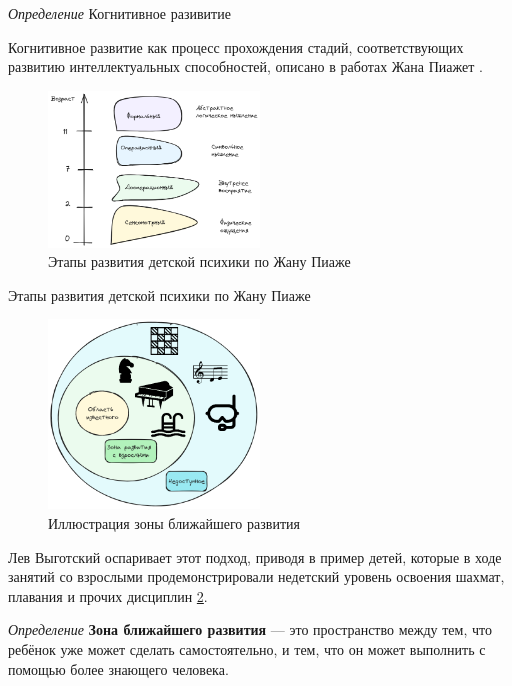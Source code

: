 
\textit{Определение} Когнитивное разивитие

Когнитивное развитие как процесс прохождения стадий, соответствующих развитию интеллектуальных
способностей, описано в работах Жана Пиажет \cite{piaget1952origins}.


\begin{figure}[h]
    \centering
    \includegraphics[width=0.5\textwidth]{assets/pedagogic/psy/piage.excalidraw.png}
    \caption{Этапы развития детской психики по Жану Пиаже \cite{piaget1952origins}}
    \label{piage}
\end{figure}

Этапы развития детской психики по Жану Пиаже


\begin{figure}[h]
    \centering
    \includegraphics[width=0.5\textwidth]{assets/pedagogic/psy/proximal_growth.excalidraw.png}
    \caption{Иллюстрация зоны ближайшего развития}
    \label{proximal_growth}
\end{figure}



Лев Выготский оспаривает этот подход, приводя в пример детей, которые в ходе занятий со взрослыми продемонстрировали
недетский уровень освоения шахмат, плавания и прочих дисциплин \ref{proximal_growth}. 


\textit{Определение} \textbf{Зона ближайшего развития} — это пространство между тем, что ребёнок уже может сделать самостоятельно, 
и тем, что он может выполнить с помощью более знающего человека.

